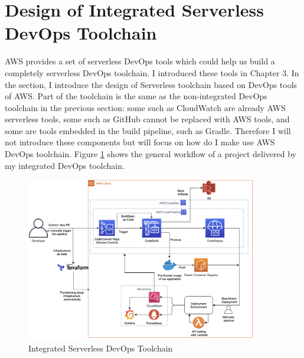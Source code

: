 \section{Design of Integrated Serverless DevOps Toolchain}
AWS provides a set of serverless DevOps tools which could help us build a completely serverless DevOps toolchain. I introduced these tools in Chapter 3. In the section, I introduce the design of Serverless toolchain based on DevOps tools of AWS. Part of the toolchain is the same as the non-integrated DevOps toolchain in the previous section: some such as CloudWatch are already AWS serverless tools, some such as GitHub cannot be replaced with AWS tools, and some are tools embedded in the build pipeline, such as Gradle. Therefore I will not introduce these components but will focus on how do I make use AWS DevOps toolchain. Figure \ref{fig:codepipeline} shows the general workflow of a project delivered by my integrated DevOps toolchain.
\begin{figure}[h]
 \centering
 \includegraphics[width=0.90\textwidth]{pics/codepipeline.png}
 \caption{Integrated Serverless DevOps Toolchain}
 \label{fig:codepipeline}
\end{figure}
